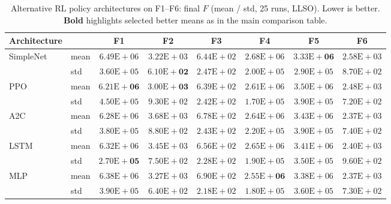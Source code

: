 \documentclass[conference]{IEEEtran}
\begin{document}
\begin{table}[!t]
\centering
\scriptsize
\caption{Alternative RL policy architectures on F1--F6: final $F$ (mean / std, 25 runs, LLSO). Lower is better. \textbf{Bold} highlights selected better means as in the main comparison table.}
\label{tab:deeprl}
\begin{tabular}{llcccccc}
\toprule
\textbf{Architecture} & & F1 & F2 & F3 & F4 & F5 & F6 \\
\midrule
SimpleNet & mean & $6.49\mathrm{E}\!+\!06$ & $3.22\mathrm{E}\!+\!03$ & $6.44\mathrm{E}\!+\!02$ & $2.68\mathrm{E}\!+\!06$ & $\mathbf{3.33\mathrm{E}\!+\!06}$ & $2.58\mathrm{E}\!+\!03$ \\
 & std & $3.60\mathrm{E}\!+\!05$ & $\mathbf{6.10\mathrm{E}\!+\!02}$ & $2.47\mathrm{E}\!+\!02$ & $2.00\mathrm{E}\!+\!05$ & $2.90\mathrm{E}\!+\!05$ & $8.70\mathrm{E}\!+\!02$ \\
PPO & mean & $\mathbf{6.21\mathrm{E}\!+\!06}$ & $\mathbf{3.00\mathrm{E}\!+\!03}$ & $6.39\mathrm{E}\!+\!02$ & $2.61\mathrm{E}\!+\!06$ & $3.50\mathrm{E}\!+\!06$ & $2.48\mathrm{E}\!+\!03$ \\
 & std & $4.50\mathrm{E}\!+\!05$ & $9.30\mathrm{E}\!+\!02$ & $2.42\mathrm{E}\!+\!02$ & $1.70\mathrm{E}\!+\!05$ & $3.90\mathrm{E}\!+\!05$ & $7.20\mathrm{E}\!+\!02$ \\
A2C & mean & $6.28\mathrm{E}\!+\!06$ & $3.68\mathrm{E}\!+\!03$ & $6.78\mathrm{E}\!+\!02$ & $2.64\mathrm{E}\!+\!06$ & $3.43\mathrm{E}\!+\!06$ & $2.37\mathrm{E}\!+\!03$ \\
 & std & $3.80\mathrm{E}\!+\!05$ & $8.80\mathrm{E}\!+\!02$ & $2.43\mathrm{E}\!+\!02$ & $2.20\mathrm{E}\!+\!05$ & $3.90\mathrm{E}\!+\!05$ & $7.40\mathrm{E}\!+\!02$ \\
LSTM & mean & $6.32\mathrm{E}\!+\!06$ & $3.45\mathrm{E}\!+\!03$ & $6.56\mathrm{E}\!+\!02$ & $2.65\mathrm{E}\!+\!06$ & $3.41\mathrm{E}\!+\!06$ & $2.40\mathrm{E}\!+\!03$ \\
 & std & $\mathbf{2.70\mathrm{E}\!+\!05}$ & $7.50\mathrm{E}\!+\!02$ & $2.28\mathrm{E}\!+\!02$ & $1.90\mathrm{E}\!+\!05$ & $3.50\mathrm{E}\!+\!05$ & $9.60\mathrm{E}\!+\!02$ \\
MLP & mean & $6.38\mathrm{E}\!+\!06$ & $3.27\mathrm{E}\!+\!03$ & $6.90\mathrm{E}\!+\!02$ & $\mathbf{2.55\mathrm{E}\!+\!06}$ & $3.38\mathrm{E}\!+\!06$ & $2.37\mathrm{E}\!+\!03$ \\
 & std & $3.90\mathrm{E}\!+\!05$ & $6.40\mathrm{E}\!+\!02$ & $2.18\mathrm{E}\!+\!02$ & $1.80\mathrm{E}\!+\!05$ & $3.60\mathrm{E}\!+\!05$ & $7.30\mathrm{E}\!+\!02$ \\

\end{tabular}
\end{table}
\end{document}
